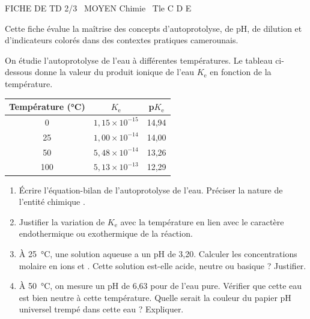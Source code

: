 \documentclass[11pt]{article}
\begin{document}
\begin{tcolorbox}[enhanced,colback=popink,colframe=popink,arc=10pt,boxrule=0pt,left=12pt,right=12pt,top=9pt,bottom=9pt]
{\color{white}\popxbold\small FICHE DE TD 2/3 \textbullet\ MOYEN \hfill Chimie \textbullet\ Tle C D E\par}
\end{tcolorbox}
\vspace{4pt}
Cette fiche évalue la maîtrise des concepts d'autoprotolyse, de pH, de dilution et d'indicateurs colorés dans des contextes pratiques camerounais.

\begin{exercice}
On étudie l'autoprotolyse de l'eau à différentes températures. Le tableau ci-dessous donne la valeur du produit ionique de l'eau $K_{\text{e}}$ en fonction de la température.

\begin{center}
\begin{tabular}{|c|c|c|}
\hline
Température (\si{\celsius}) & $K_{\text{e}}$ & p$K_{\text{e}}$ \\
\hline
0 & $1,15 \times 10^{-15}$ & 14,94 \\
25 & $1,00 \times 10^{-14}$ & 14,00 \\
50 & $5,48 \times 10^{-14}$ & 13,26 \\
100 & $5,13 \times 10^{-13}$ & 12,29 \\
\hline
\end{tabular}
\end{center}

\begin{enumerate}
    \item Écrire l'équation-bilan de l'autoprotolyse de l'eau. Préciser la nature de l'entité chimique .
    \item Justifier la variation de $K_{\text{e}}$ avec la température en lien avec le caractère endothermique ou exothermique de la réaction.
    \item À \SI{25}{\celsius}, une solution aqueuse a un pH de 3,20. Calculer les concentrations molaire en ions  et . Cette solution est-elle acide, neutre ou basique ? Justifier.
    \item À \SI{50}{\celsius}, on mesure un pH de 6,63 pour de l'eau pure. Vérifier que cette eau est bien neutre à cette température. Quelle serait la couleur du papier pH universel trempé dans cette eau ? Expliquer.
\end{enumerate}
\end{exercice}
\end{document}
